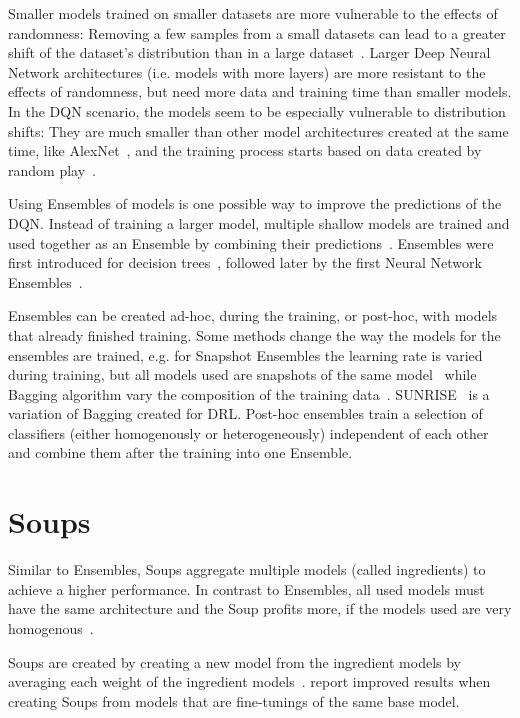 Smaller models trained on smaller datasets are more vulnerable to the effects of randomness: Removing a few samples from a small datasets can lead to a greater shift of the dataset's distribution than in a large dataset~\parencite{choromanska_loss_2015}. Larger Deep Neural Network architectures (i.e. models with more layers) are more resistant to the effects of randomness, but need more data and training time than smaller models. In the DQN scenario, the models seem to be especially vulnerable to distribution shifts: They are much smaller than other model architectures created at the same time, like AlexNet~\parencite{krizhevsky_imagenet_2012}, and the training process starts based on data created by random play~\parencite{mnih_playing_2013}.

Using Ensembles of models is one possible way to improve the predictions of the DQN. Instead of training a larger model,  multiple shallow models are trained and used together as an Ensemble by combining their predictions~\parencite{kwok_multiple_1990,hansen_neural_1990,breiman_bagging_1996}. Ensembles were first introduced for decision trees~\parencite{kwok_multiple_1990}, followed later by the first Neural Network Ensembles~\parencite{hansen_neural_1990}.

Ensembles can be created ad-hoc, during the training, or post-hoc, with models that already finished training. Some methods change the way the models for the ensembles are trained, e.g. for Snapshot Ensembles the learning rate is varied during training, but all models used are snapshots of the same model~\parencite{huang_snapshot_2017} while Bagging algorithm vary the composition of the training data~\parencite{breiman_bagging_1996}. SUNRISE~\parencite{lee_sunrise_2021} is a variation of Bagging created for DRL. Post-hoc ensembles train a selection of classifiers (either homogenously or heterogeneously) independent of each other and combine them after the training into one Ensemble.

\section{Soups}

Similar to Ensembles, Soups aggregate multiple models (called ingredients) to achieve a higher performance. In contrast to Ensembles, all used models must have the same architecture and the Soup profits more, if the models used are very homogenous~\parencite{wortsman_model_2022}.

Soups are created by creating a new model from the ingredient models by averaging each weight of the ingredient models~\parencite{wortsman_model_2022}. \textcite{wortsman_model_2022} report improved results when creating Soups from models that are fine-tunings of the same base model.

